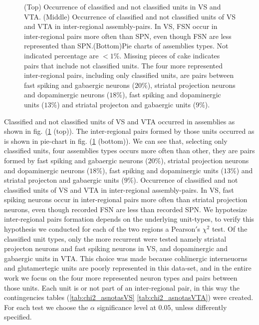 \begin{figure}[H]
    \caption{(Top) Occurrence of classified and not classified units in VS and VTA. (Middle) Occurrence of classified and not classified units of VS and VTA in inter-regional assembly-pairs. In VS, FSN occur in inter-regional pairs more often than SPN, even though FSN are less represented than SPN.(Bottom)Pie charts of assemblies types. Not indicated percentage are $<1\%$. Missing pieces of cake indicates pairs that include not classified units. The four more represented inter-regional pairs, including only classified units, are pairs between fast spiking and gabaergic neurons ($20\%$), striatal projection neurons and dopaminergic neurons ($18\%$), fast spiking and dopaminergic units ($13\%$) and striatal projecton and gabaergic units ($9\%$). }
    \label{fig:PieAssembliesTot}
\end{figure}
Classified and not classified units of VS and VTA occurred in assemblies as shown in fig. (\ref{fig:PieAssembliesTot} (top)). The inter-regional pairs formed by those units occurred as is shown in pie-chart in fig. (\ref{fig:PieAssembliesTot} (bottom)). We can see that, selecting only classified units, four assemblies types occurs more often than other, they are pairs formed by fast spiking and gabaergic neurons ($20\%$), striatal projection neurons and dopaminergic neurons ($18\%$), fast spiking and dopaminergic units ($13\%$) and striatal projecton and gabaergic units ($9\%$). Occurrence of classified and not classified units of VS and VTA in inter-regional assembly-pairs. In VS, fast spiking neurons occur in inter-regional pairs more often than striatal projection neurons, even though recorded FSN are less than recorded SPN. We hypotesize inter-regional pairs formation depends on the underlying unit-types, to verify this hypothesis we conducted for each of the two regions a Pearson$'$s $\chi^2$ test. Of the classified unit types, only the more recurrent were tested namely striatal projecton neurons and fast spiking neurons in VS, and dopaminergic and gabaergic units in VTA. This choice was made because cohlinergic interneuorns and glutamertegic units are poorly represented in this data-set, and in the entire work we focus on the four more represented neuron types and pairs between those units. Each unit is or not part of an inter-regional pair, in this way the contingencies tables (\ref{tab:chi2_asnotasVS} \ref{tab:chi2_asnotasVTA}) were created. For each test we choose the $\alpha$ significance level at $0.05$, unless differently specified.
